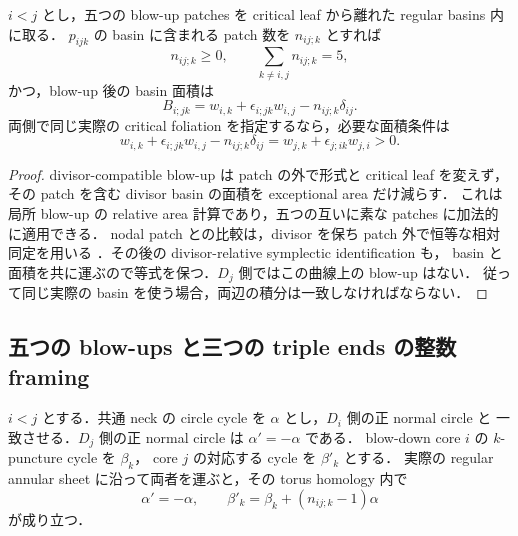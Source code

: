 \begin{lemma}\label{qg8:basin-area}
$i<j$ とし，五つの blow-up patches を critical leaf から離れた regular basins 内に取る．
$p_{ijk}$ の basin に含まれる patch 数を $n_{ij;k}$ とすれば
\[
 n_{ij;k}\geq0,\qquad\sum_{k\ne i,j}n_{ij;k}=5,
\]
かつ，blow-up 後の basin 面積は
\begin{equation}\label{qg8:actual-basin}
 B_{i;jk}=w_{i,k}+\epsilon_{i;jk}w_{i,j}-n_{ij;k}\delta_{ij}.
\end{equation}
両側で同じ実際の critical foliation を指定するなら，必要な面積条件は
\begin{equation}\label{qg8:area-match}
 w_{i,k}+\epsilon_{i;jk}w_{i,j}-n_{ij;k}\delta_{ij}
 =w_{j,k}+\epsilon_{j;ik}w_{j,i}>0.
\end{equation}
\end{lemma}

\begin{proof}
divisor-compatible blow-up は patch の外で形式と critical leaf を変えず，
その patch を含む divisor basin の面積を exceptional area だけ減らす．
これは局所 blow-up の relative area 計算であり，五つの互いに素な patches に加法的に適用できる．
nodal patch との比較は，divisor を保ち patch 外で恒等な相対同定を用いる
\cite[Theorem 1.1]{CGblowup}．その後の divisor-relative symplectic identification も，
basin と面積を共に運ぶので等式を保つ．$D_j$ 側ではこの曲線上の blow-up はない．
従って同じ実際の basin を使う場合，両辺の積分は一致しなければならない．
\end{proof}

\subsection{五つの blow-ups と三つの triple ends の整数 framing}

\begin{lemma}\label{qg8:framing}
$i<j$ とする．共通 neck の circle cycle を $\alpha$ とし，$D_i$ 側の正 normal circle と
一致させる．$D_j$ 側の正 normal circle は $\alpha'=-\alpha$ である．
blow-down core $i$ の $k$-puncture cycle を $\beta_k$，
core $j$ の対応する cycle を $\beta'_k$ とする．
実際の regular annular sheet に沿って両者を運ぶと，その torus homology 内で
\begin{equation}\label{qg8:cycle-shear}
 \alpha'=-\alpha,\qquad
 \beta'_k=\beta_k+(n_{ij;k}-1)\alpha
\end{equation}
が成り立つ．
\end{lemma}

